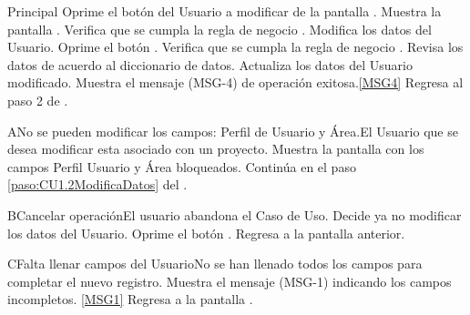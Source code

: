 	\begin{UCtrayectoria}{Principal}
			\UCpaso[\UCactor] Oprime el botón  del Usuario a modificar de la pantalla .
			\UCpaso Muestra la pantalla .
			\UCpaso Verifica que se cumpla la regla de negocio .  
     			\UCpaso [\UCactor] Modifica los datos del Usuario.\label{paso:CU1.2ModificaDatos}
			\UCpaso [\UCactor] Oprime el botón .
			\UCpaso Verifica que se cumpla la regla de negocio . 
			\UCpaso Revisa los datos de acuerdo al diccionario de datos. 
			\UCpaso Actualiza los datos del Usuario modificado.
			\UCpaso Muestra el mensaje (MSG-4) de operación exitosa.\ref{MSG4}
			\UCpaso Regresa al paso 2 de .
	\end{UCtrayectoria}

		\begin{UCtrayectoriaA}{A}{No se pueden modificar los campos: Perfil de Usuario y Área.}{El Usuario que se desea modificar esta asociado con un proyecto.}	
			\UCpaso Muestra la pantalla  con los campos Perfil Usuario y Área bloqueados.
			\UCpaso Continúa en el paso \ref{paso:CU1.2ModificaDatos} del .
		\end{UCtrayectoriaA}

		\begin{UCtrayectoriaA}{B}{Cancelar operación}{El usuario abandona el Caso de Uso.}
			\UCpaso[\UCactor] Decide ya no modificar los datos del Usuario.
			\UCpaso[\UCactor] Oprime el botón .
			\UCpaso Regresa a la pantalla anterior.
		\end{UCtrayectoriaA}

		\begin{UCtrayectoriaA}{C}{Falta llenar campos del Usuario}{No se han llenado todos los campos para completar el nuevo registro.}
			\UCpaso Muestra el mensaje (MSG-1) indicando los campos incompletos. \ref{MSG1}
			\UCpaso Regresa a la pantalla .
		\end{UCtrayectoriaA}

